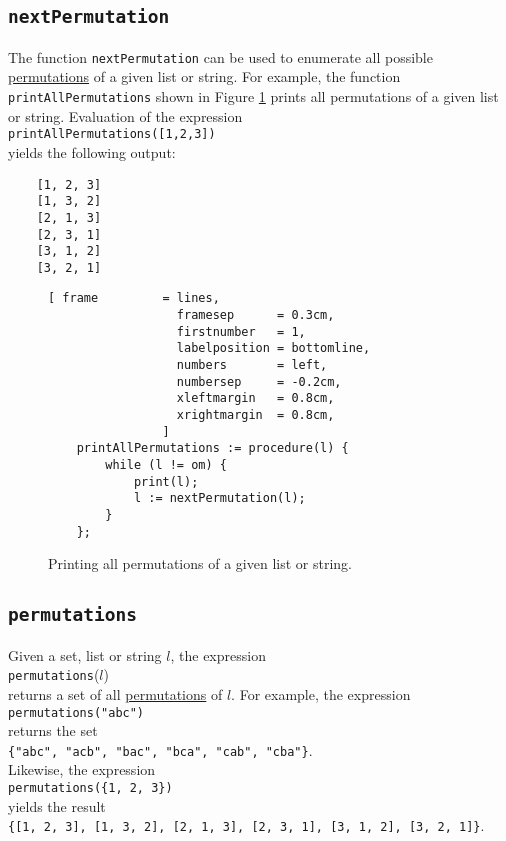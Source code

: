 \subsection{\texttt{nextPermutation}}
The function \texttt{nextPermutation} can be used to enumerate all possible 
\href{https://en.wikipedia.org/wiki/Permutation}{permutations}
of a given list or string.  For example, the function \texttt{printAllPermutations} shown
in Figure \ref{fig:allPermutations.stlx} prints all permutations of a given list or string.
Evaluation of the expression
\\[0.2cm]
\hspace*{1.3cm}
\texttt{printAllPermutations([1,2,3])}
\\[0.2cm]
yields the following output:
\begin{verbatim}
    [1, 2, 3]
    [1, 3, 2]
    [2, 1, 3]
    [2, 3, 1]
    [3, 1, 2]
    [3, 2, 1]
\end{verbatim}

\begin{figure}[!ht]
\centering
\begin{Verbatim}[ frame         = lines, 
                  framesep      = 0.3cm, 
                  firstnumber   = 1,
                  labelposition = bottomline,
                  numbers       = left,
                  numbersep     = -0.2cm,
                  xleftmargin   = 0.8cm,
                  xrightmargin  = 0.8cm,
                ]
    printAllPermutations := procedure(l) {
        while (l != om) {
            print(l);
            l := nextPermutation(l);        
        }
    };
\end{Verbatim}
\vspace*{-0.3cm}
\caption{Printing all permutations of a given list or string.}
\label{fig:allPermutations.stlx}
\end{figure}

\subsection{\texttt{permutations}}
Given a set, list or string $l$, the expression
\\[0.2cm]
\hspace*{1.3cm}
\texttt{permutations}($l$)
\\[0.2cm]
returns a set of all \href{https://en.wikipedia.org/wiki/Permutation}{permutations} of $l$.  For
example, the expression 
\\[0.2cm]
\hspace*{1.3cm}
\texttt{permutations("abc")}
\\[0.2cm]
returns the set
\\[0.2cm]
\hspace*{1.3cm}
\texttt{\{"abc", "acb", "bac", "bca", "cab", "cba"\}}.
\\[0.2cm]
Likewise, the expression
\\[0.2cm]
\hspace*{1.3cm}
\texttt{permutations(\{1, 2, 3\})}
\\[0.2cm]
yields the result
\\[0.2cm]
\hspace*{1.3cm}
\texttt{\{[1, 2, 3], [1, 3, 2], [2, 1, 3], [2, 3, 1], [3, 1, 2], [3, 2, 1]\}}.

